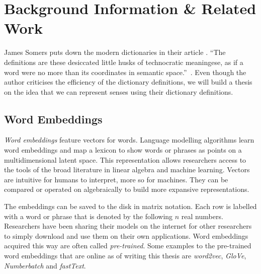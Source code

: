 
\chapter{Background Information \& Related Work}%
\label{chap:background_n_related}

James Somers puts down the modern dictionaries in their article .
\enquote{The definitions are these desiccated little husks of technocratic meaningese, as if a word were no more than its coordinates in semantic space.}~\cite{somers_youre_2014}.
Even though the author criticises the efficiency of the dictionary definitions, we will build a thesis on the idea that we can represent senses using their dictionary definitions.

\section{Word Embeddings}%
\label{sec:word_embeddings}


\emph{Word embeddings} feature vectors for words.
Language modelling algorithms learn word embeddings and map a lexicon to show words or phrases as points on a multidimensional latent space.
This representation allows researchers access to the tools of the broad literature in linear algebra and machine learning.
Vectors are intuitive for humans to interpret, more so for machines.
They can be compared or operated on algebraically to build more expansive representations.

The embeddings can be saved to the disk in matrix notation.
Each row is labelled with a word or phrase that is denoted by the following $n$ real numbers.
Researchers have been sharing their models on the internet for other researchers to simply download and use them on their own applications.
Word embeddings acquired this way are often called \emph{pre-trained}.
Some examples to the pre-trained word embeddings that are online as of writing this thesis are \emph{word2vec}, \emph{GloVe}, \emph{Numberbatch} and \emph{fastText}.

